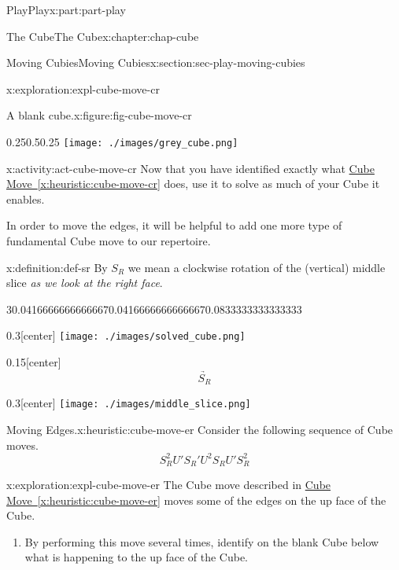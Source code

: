 \documentclass[oneside,10pt,]{book}
\newcommand{\xreffont}{\relax}
\numberwithin{equation}{section}
\begin{document}
\begin{partptx}{Play}{}{Play}{}{}{x:part:part-play}
\begin{chapterptx}{The Cube}{}{The Cube}{}{}{x:chapter:chap-cube}
\begin{sectionptx}{Moving Cubies}{}{Moving Cubies}{}{}{x:section:sec-play-moving-cubies}
\begin{exploration}{}{x:exploration:expl-cube-move-cr}
\begin{figureptx}{A blank cube.}{x:figure:fig-cube-move-cr}{}
\begin{image}{0.25}{0.5}{0.25}%
\texttt{[image: ./images/grey\_cube.png]}
\end{image}%
\tcblower
\end{figureptx}%
\end{exploration}%
\begin{activity}{}{x:activity:act-cube-move-cr}%
Now that you have identified exactly what \hyperref[x:heuristic:cube-move-cr]{Cube Move~{\xreffont\ref{x:heuristic:cube-move-cr}}} does, use it to solve as much of your Cube it enables.%
\end{activity}%
In order to move the edges, it will be helpful to add one more type of fundamental Cube move to our repertoire.%
\begin{definition}{}{x:definition:def-sr}%
%
By \(S_R\) we mean a clockwise rotation of the (vertical) middle slice \emph{as we look at the right face}.%
\begin{sidebyside}{3}{0.0416666666666667}{0.0416666666666667}{0.0833333333333333}%
\begin{sbspanel}{0.3}[center]%
\texttt{[image: ./images/solved\_cube.png]}
\end{sbspanel}%
\begin{sbspanel}{0.15}[center]%
%
\begin{equation*}
\underrightarrow{\quad S_R\quad}
\end{equation*}
%
\end{sbspanel}%
\begin{sbspanel}{0.3}[center]%
\texttt{[image: ./images/middle\_slice.png]}
\end{sbspanel}%
\end{sidebyside}%
\end{definition}
\begin{heuristic}{Moving Edges.}{}{x:heuristic:cube-move-er}%
%
Consider the following sequence of Cube moves.%
%
\begin{equation*}
S_R^2 U' S_R' U^2 S_R U' S_R^2
\end{equation*}
\end{heuristic}
\begin{exploration}{}{x:exploration:expl-cube-move-er}%
The Cube move described in \hyperref[x:heuristic:cube-move-er]{Cube Move~{\xreffont\ref{x:heuristic:cube-move-er}}} moves some of the edges on the up face of the Cube.%
%
\begin{enumerate}
\item{}By performing this move several times, identify on the blank Cube below what is happening to the up face of the Cube.%

\end{enumerate}
\end{exploration}
\end{sectionptx}
\end{chapterptx}
\end{partptx}
\end{document}

